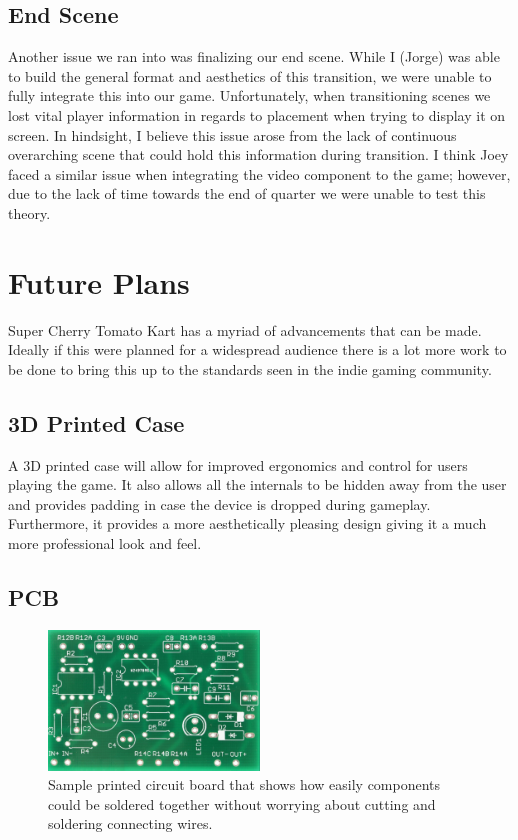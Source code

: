 \documentclass[a4paper,10pt]{article}
\begin{document}
\subsection{End Scene}
Another issue we ran into was finalizing our end scene. While I (Jorge) was able to build the general format and aesthetics of this transition, we were unable to fully integrate this into our game. Unfortunately, when transitioning scenes we lost vital player information in regards to placement when trying to display it on screen. In hindsight, I believe this issue arose from the lack of continuous overarching scene that could hold this information during transition. I think Joey faced a similar issue when integrating the video component to the game; however, due to the lack of time towards the end of quarter we were unable to test this theory.

\section{Future Plans}
Super Cherry Tomato Kart has a myriad of advancements that can be made. Ideally if this were planned for a widespread audience there is a lot more work to be done to bring this up to the standards seen in the indie gaming community. 

\subsection{3D Printed Case}
A 3D printed case will allow for improved ergonomics and control for users playing the game. It also allows all the internals to be hidden away from the user and provides padding in case the device is dropped during gameplay. Furthermore, it provides a more aesthetically pleasing design giving it a much more professional look and feel.

\subsection{PCB}
\begin{figure}[H]
  \centering
      \includegraphics[width=0.5\textwidth]{Assets/PCB.png}
  \caption{Sample printed circuit board that shows how easily components could be soldered together without worrying about cutting and soldering connecting wires.}
\end{figure}
\end{document}
